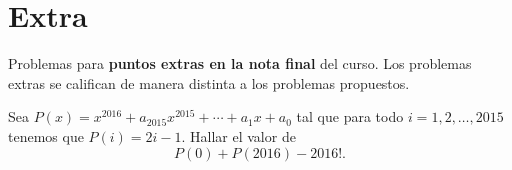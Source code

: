 \section{Extra}

Problemas para \textbf{puntos extras en la nota final} del curso.
Los problemas extras se califican de manera distinta a los problemas propuestos.

\begin{problem}
    Sea $P(x) = x^{2016} + a_{2015} x^{2015} + \cdots + a_1 x + a_0$ tal que para todo $i = 1, 2, \ldots, 2015$ tenemos que $P(i) = 2i - 1$.
    Hallar el valor de
    \[
        P(0) + P(2016) - 2016!.
    \]
\end{problem}